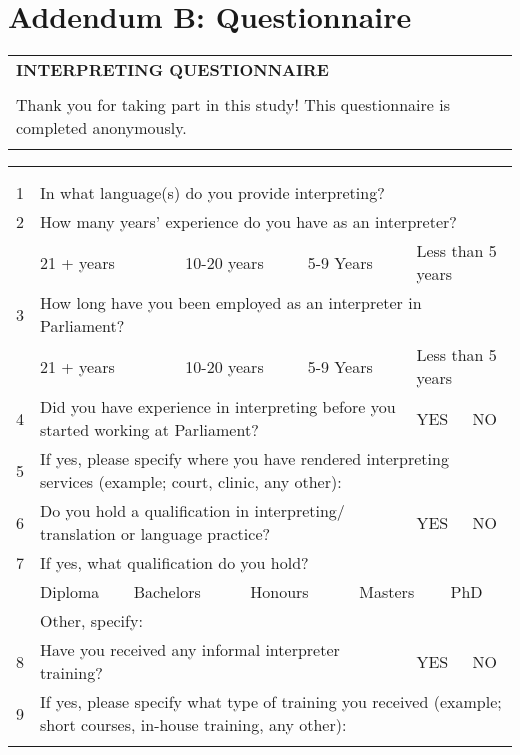 \documentclass[output=paper]{langsci/langscibook}
\begin{document}
\section*{Addendum B: Questionnaire}

\begin{tabularx}{\textwidth}{X}
\lsptoprule

\textbf{INTERPRETING QUESTIONNAIRE}\\
\\
Thank you for taking part in this study! This questionnaire is completed anonymously. \\
\lspbottomrule
\end{tabularx}
\begin{tabularx}{\textwidth}{XXXXXXXXXX}
\lsptoprule

\multicolumn{10}{X}{\textbf{Section A: Interpreting Experience}

}\\
&  &  &  &  &  &  &  &  & \\
1 & \multicolumn{9}{X}{In what language(s) do you provide interpreting?

}\\
2 & \multicolumn{9}{X}{How many years’ experience do you have as an interpreter?}\\
& \multicolumn{2}{X}{21 + years

} & \multicolumn{2}{X}{10-20 years} & \multicolumn{2}{X}{5-9 Years} & \multicolumn{3}{X}{Less than 5 years}\\
3 & \multicolumn{9}{X}{How long have you been employed as an interpreter in Parliament?}\\
& \multicolumn{2}{X}{21 + years

} & \multicolumn{2}{X}{10-20 years} & \multicolumn{2}{X}{5-9 Years} & \multicolumn{3}{X}{Less than 5 years}\\
\hhline{~---------}
4 & \multicolumn{6}{X}{Did you have experience in interpreting before you started working at Parliament?} & \multicolumn{2}{X}{YES} & NO\\
5 & \multicolumn{9}{X}{If yes, please specify where you have rendered interpreting services (example; court, clinic, any other):

}\\
6 & \multicolumn{6}{X}{Do you hold a qualification in interpreting/ translation or language practice?} & \multicolumn{2}{X}{YES} & NO\\
7 & \multicolumn{9}{X}{If yes, what qualification do you hold?}\\
& \multicolumn{1}{X}{Diploma

} & \multicolumn{2}{X}{Bachelors} & \multicolumn{2}{X}{Honours} & \multicolumn{2}{X}{Masters} & \multicolumn{2}{X}{PhD}\\
\hhline{~---------} & \multicolumn{9}{X}{Other, specify:}\\
8 & \multicolumn{6}{X}{Have you received any informal interpreter training?} & \multicolumn{2}{X}{YES} & NO\\
9 & \multicolumn{9}{X}{If yes, please specify what type of training you received (example; short courses, in-house training, any other):}\\
\lspbottomrule
\end{tabularx}
\end{document}
